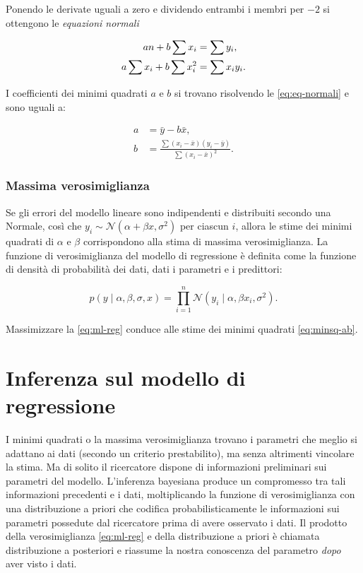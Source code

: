 \documentclass[
]{memoir}
\begin{document}
\noindent
Ponendo le derivate uguali a zero e dividendo entrambi i membri per \(-2\) si ottengono le \emph{equazioni normali}

\begin{align}
 an + b \sum x_i &= \sum y_i, \notag \\
 a \sum x_i + b \sum x_i^2 &= \sum x_i y_i. 
 \label{eq:eq-normali}
\end{align}

\noindent
I coefficienti dei minimi quadrati \(a\) e \(b\) si trovano risolvendo le \eqref{eq:eq-normali} e sono uguali a:

\begin{align}
a &= \bar{y} - b \bar{x},\\
b &= \frac{\sum (x_i - \bar{x}) (y_i - \bar{y})}{\sum (x_i - \bar{x})^2}.
\label{eq:minsq-ab}
\end{align}

\hypertarget{massima-verosimiglianza}{%
\subsection{Massima verosimiglianza}\label{massima-verosimiglianza}}

Se gli errori del modello lineare sono indipendenti e distribuiti secondo una Normale, così che \(y_i \sim \mathcal{N}(\alpha + \beta x, \sigma^2)\) per ciascun \(i\), allora le stime dei minimi quadrati di \(\alpha\) e \(\beta\) corrispondono alla stima di massima verosimiglianza. La funzione di verosimiglianza del modello di regressione è definita come la funzione di densità di probabilità dei dati, dati i parametri e i predittori:

\begin{equation}
p(y \mid \alpha, \beta, \sigma, x) = \prod_{i=1}^n \mathcal{N}(y_i \mid \alpha, \beta x_i, \sigma^2). 
\label{eq:ml-reg}
\end{equation}

\noindent
Massimizzare la \eqref{eq:ml-reg} conduce alle stime dei minimi quadrati \eqref{eq:minsq-ab}.

\hypertarget{inferenza-sul-modello-di-regressione}{%
\chapter{Inferenza sul modello di regressione}\label{inferenza-sul-modello-di-regressione}}

I minimi quadrati o la massima verosimiglianza trovano i parametri che meglio si adattano ai dati (secondo un criterio prestabilito), ma senza altrimenti vincolare la stima. Ma di solito il ricercatore dispone di informazioni preliminari sui parametri del modello. L'inferenza bayesiana produce un compromesso tra tali informazioni precedenti e i dati, moltiplicando la funzione di verosimiglianza con una distribuzione a priori che codifica probabilisticamente le informazioni sui parametri possedute dal ricercatore prima di avere osservato i dati. Il prodotto della verosimiglianza \eqref{eq:ml-reg} e della distribuzione a priori è chiamata distribuzione a posteriori e riassume la nostra conoscenza del parametro \emph{dopo} aver visto i dati.
\end{document}
